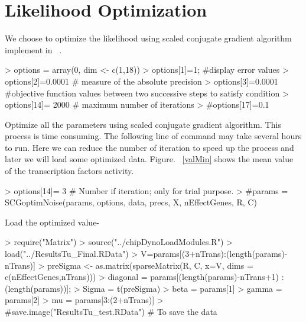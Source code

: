 \documentclass[11pt, a4paper, oneside]{article}
\begin{document}
\section{Likelihood Optimization}
We choose to optimize the likelihood using scaled conjugate gradient algorithm implement in  ~\cite{nabney:01}. 

\begin{Schunk}
\begin{Sinput}
> options = array(0, dim <- c(1,18))
> options[1]=1; #display error values
> options[2]=0.0001 # measure of the absolute precision
> options[3]=0.0001  #objective function values between two successive steps to satisfy condition
> options[14]= 2000  # maximum number of iterations
> #options[17]=0.1 
\end{Sinput}
\end{Schunk}

Optimize all the parameters using scaled conjugate gradient algorithm. This process is time consuming. The following line of command may take several hours to run. Here we can reduce the number of iteration to speed up the process and later we will load some optimized data. Figure. ~\ref{valMin} shows the mean value of the transcription factors activity.

\begin{Schunk}
\begin{Sinput}
> options[14]= 3 # Number if iteration; only for trial purpose.
> #params = SCGoptimNoise(params, options, data, precs, X, nEffectGenes, R, C)
\end{Sinput}
\end{Schunk}

Load the optimized value-
\begin{Schunk}
\begin{Sinput}
> require("Matrix")
> source("../chipDynoLoadModules.R")
> load("../ResultsTu_Final.RData")
> V=params[(3+nTrans):(length(params)-nTrans)]
> preSigma <- as.matrix(sparseMatrix(R, C, x=V, dims = c(nEffectGenes,nTrans)))
> diagonal = params[(length(params)-nTrans+1) :(length(params))];
> Sigma = t(preSigma)%
> beta = params[1]
> gamma = params[2]
> mu = params[3:(2+nTrans)]
> #save.image("ResultsTu_test.RData") # To save the data 
\end{Sinput}
\end{Schunk}
\end{document}
